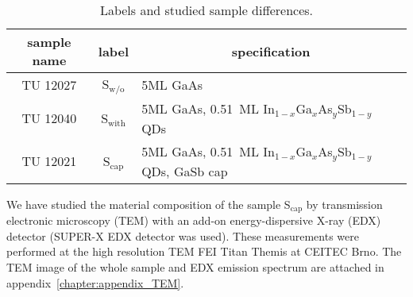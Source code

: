 \begin{table}
	\centering
	\caption{Labels and studied sample differences.}
	\begin{tabularx}{0.95\textwidth}{ccl}
		\toprule

		sample name & label& \multicolumn{1}{c}{specification}\\ 		
		\midrule
		\midrule
		TU 12027& S$_\mathrm{w/o}$ & 5ML GaAs\\
		TU 12040& S$_\mathrm{with}$ & 5ML GaAs, 0.51~ML In$_{1-x}$Ga$_{x}$As$_y$Sb$_{1-y}$ QDs\\
		TU 12021 & S$_\mathrm{cap}$ & 5ML GaAs, 0.51~ML In$_{1-x}$Ga$_{x}$As$_y$Sb$_{1-y}$ QDs, GaSb cap\\
		\bottomrule
	\end{tabularx}\label{tab:samples}
\end{table}



We have studied the material composition of the sample S$_\mathrm{cap}$ by transmission electronic microscopy (TEM) with an add-on energy-dispersive X-ray (EDX) detector (SUPER-X EDX detector was used). These measurements were performed at the high resolution TEM FEI Titan Themis at CEITEC Brno. The TEM image of the whole sample and EDX emission spectrum are attached in appendix~\ref{chapter:appendix_TEM}.

